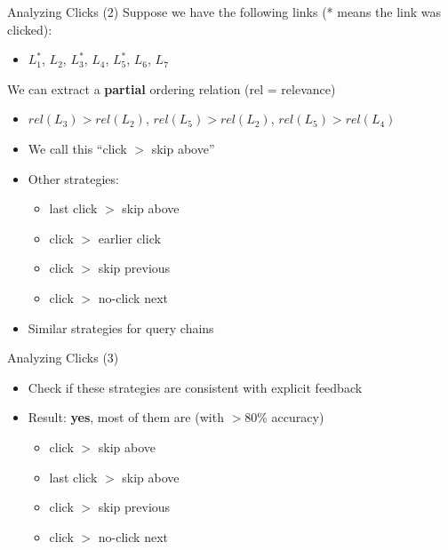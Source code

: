 \begin{frame}{Analyzing Clicks (2)}
  Suppose we have the following links (* means the link was clicked): \newline
  \begin{itemize}
  \item $L_1^{*}$, $L_2$, $L_3^{*}$, $L_4$, $L_5^{*}$, $L_6$, $L_7$
  \end{itemize}
  We can extract a \textbf{partial} ordering relation (rel = relevance)
  \begin{itemize}
    \item $rel(L_3) > rel(L_2)$, $rel(L_5) > rel(L_2)$, $rel(L_5) > rel(L_4)$
    \item We call this ``click $>$ skip above''
    \item Other strategies:
      \begin{itemize}
      \item last click $>$ skip above
      \item click $>$ earlier click
      \item click $>$ skip previous
      \item click $>$ no-click next
      \end{itemize}
    \item Similar strategies for query chains
  \end{itemize}
\end{frame}

\begin{frame}{Analyzing Clicks (3)}
  \begin{itemize}
  \item Check if these strategies are consistent with explicit feedback
  \item Result: \textbf{yes}, most of them are (with $> 80\%$ accuracy)
    \begin{itemize}
    \item click $>$ skip above
    \item last click $>$ skip above
    \item click $>$ skip previous
    \item click $>$ no-click next
    \end{itemize}
  \end{itemize}
\end{frame}

